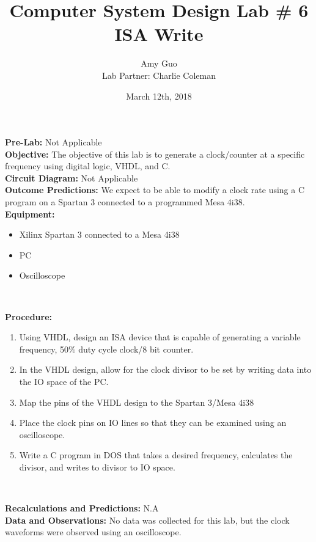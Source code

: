 \documentclass{article}
\title{Computer System Design Lab \# 6\\ISA Write}
\author{Amy Guo \\ Lab Partner: Charlie Coleman}
\date{March 12th, 2018}
\newcommand{\sect}[1]{\noindent\textbf{#1}}
\begin{document}
\maketitle
\pagebreak

\sect{Pre-Lab:} Not Applicable\\

\sect{Objective:} The objective of this lab is to generate a clock/counter at a specific frequency using digital logic, VHDL, and C.\\

\sect{Circuit Diagram:} Not Applicable \\

\sect{Outcome Predictions:} We expect to be able to modify a clock rate using a C program on a Spartan 3 connected to a programmed Mesa 4i38.\\

\sect{Equipment:}

\begin{itemize}[noitemsep, nolistsep]
	\item Xilinx Spartan 3 connected to a Mesa 4i38
	\item PC
	\item Oscilloscope
\end{itemize}~

\sect{Procedure:}

\begin{enumerate}
	\item Using VHDL, design an ISA device that is capable of generating a variable frequency, 50\% duty cycle clock/8 bit counter.
	\item In the VHDL design, allow for the clock divisor to be set by writing data into the IO space of the PC.
	\item Map the pins of the VHDL design to the Spartan 3/Mesa 4i38
	\item Place the clock pins on IO lines so that they can be examined using an oscilloscope.
	\item Write a C program in DOS that takes a desired frequency, calculates the divisor, and writes to divisor to IO space.
\end{enumerate}~

\sect{Recalculations and Predictions:} N.A\\

\sect{Data and Observations:} No data was collected for this lab, but the clock waveforms were observed using an oscilloscope.\\
\end{document}

